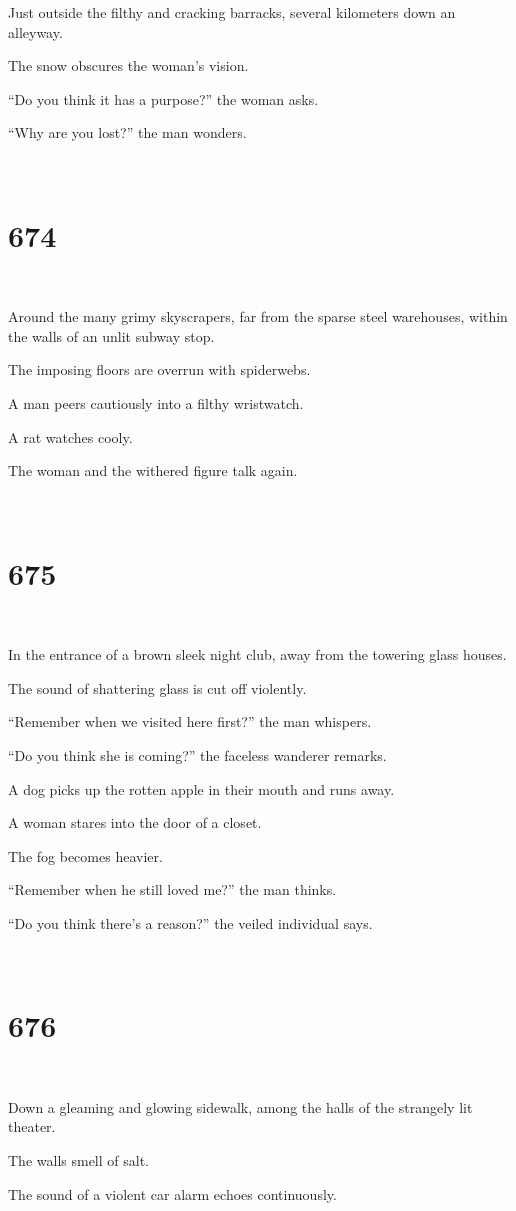 \documentclass{report}
\begin{document}
Just outside the filthy and cracking barracks, several kilometers down an alleyway.

The snow obscures the woman's vision.

``Do you think it has a purpose?'' the woman asks.

``Why are you lost?'' the man wonders.

~
\chapter*{674}
~

Around the many grimy skyscrapers, far from the sparse steel warehouses, within the walls of an unlit subway stop.

The imposing floors are overrun with spiderwebs.

A man peers cautiously into a filthy wristwatch.

A rat watches cooly.

The woman and the withered figure talk again.

~
\chapter*{675}
~

In the entrance of a brown sleek night club, away from the towering glass houses.

The sound of shattering glass is cut off violently.

``Remember when we visited here first?'' the man whispers.

``Do you think she is coming?'' the faceless wanderer remarks.

A dog picks up the rotten apple in their mouth and runs away.

A woman stares into the door of a closet.

The fog becomes heavier.

``Remember when he still loved me?'' the man thinks.

``Do you think there's a reason?'' the veiled individual says.

~
\chapter*{676}
~

Down a gleaming and glowing sidewalk, among the halls of the strangely lit theater.

The walls smell of salt.

The sound of a violent car alarm echoes continuously.
\end{document}
